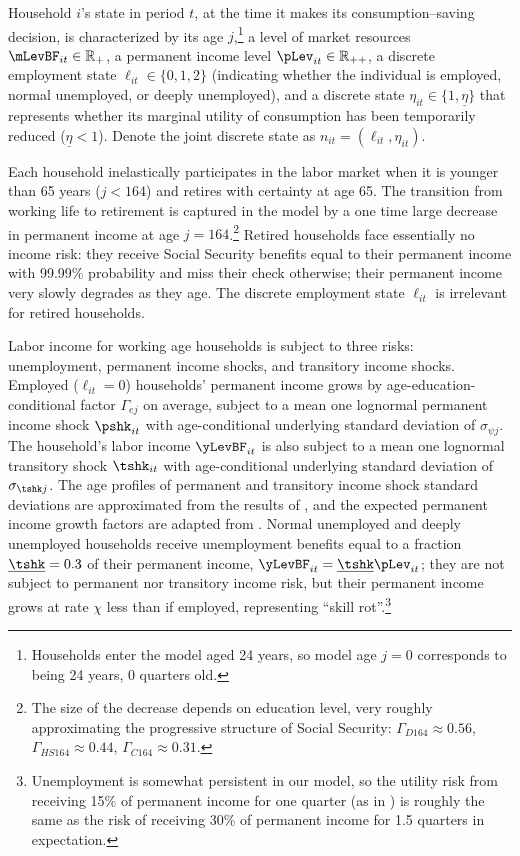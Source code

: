 \documentclass[./ConsumptionResponse]{subfiles}
\begin{document}
Household $i$'s state in period $t$, at the time it makes its consumption--saving decision, is characterized by its age $j$,\footnote{Households enter the model aged 24 years, so model age $j=0$ corresponds to being 24 years, 0 quarters old.} a level of market resources $\mLevBF_{it} \in \mathbb{R}_+$, a permanent income level $\pLev_{it} \in \mathbb{R}_{++}$, a discrete employment state $\ell_{it} \in \{0,1,2\}$ (indicating whether the individual is employed, normal unemployed, or deeply unemployed), and a discrete state $\eta_{it} \in \{1,\underline{\eta}\}$ that represents whether its marginal utility of consumption has been temporarily reduced ($\underline{\eta} < 1$).
Denote the joint discrete state as $n_{it} = (\ell_{it},\eta_{it})$.

Each household inelastically participates in the labor market when it is younger than 65 years ($j < 164$) and retires with certainty at age 65.
The transition from working life to retirement is captured in the model by a one time large decrease in permanent income at age $j=164$.\footnote{The size of the decrease depends on education level, very roughly approximating the progressive structure of Social Security: $\Gamma_{D164} \approx 0.56$, $\Gamma_{HS164} \approx 0.44$, $\Gamma_{C164} \approx 0.31$.}
Retired households face essentially no income risk: they receive Social Security benefits equal to their permanent income with 99.99\% probability and miss their check otherwise; their permanent income very slowly degrades as they age.
The discrete employment state $\ell_{it}$ is irrelevant for retired households.

Labor income for working age households is subject to three risks: unemployment, permanent income shocks, and transitory income shocks.
Employed ($\ell_{it}=0$) households' permanent income grows by age-education-conditional factor $\Gamma_{ej}$ on average, subject to a mean one lognormal permanent income shock $\pshk_{it}$ with age-conditional underlying standard deviation of $\sigma_{\psi j}$.
The household's labor income $\yLevBF_{it}$ is also subject to a mean one lognormal transitory shock $\tshk_{it}$ with age-conditional underlying standard deviation of $\sigma_{\tshk j}$.
The age profiles of permanent and transitory income shock standard deviations are approximated from the results of \cite{SabelhausSong}, and the expected permanent income growth factors are adapted from \cite{Cagetti}.
Normal unemployed and deeply unemployed households receive unemployment benefits equal to a fraction $\underline{\tshk}=0.3$ of their permanent income, $\yLevBF_{it} = \underline{\tshk} \pLev_{it}$; they are not subject to permanent nor transitory income risk, but their permanent income grows at rate $\chi$ less than if employed, representing ``skill rot''.\footnote{Unemployment is somewhat persistent in our model, so the utility risk from receiving 15\% of permanent income for one quarter (as in \cite{cstwMPC}) is roughly the same as the risk of receiving 30\% of permanent income for 1.5 quarters in expectation.}
\end{document}
